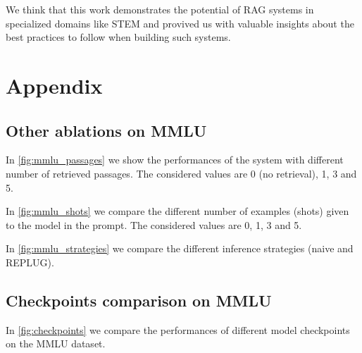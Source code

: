 \documentclass[11pt]{article}
\begin{document}
We think that this work demonstrates the potential of RAG systems in specialized 
domains like STEM and provived us with valuable insights about the best practices 
to follow when building such systems.

\newpage



\nocite{*}

\appendix

\section{Appendix}
\label{sec:appendix}

\subsection{Other ablations on MMLU}

In \ref{fig:mmlu_passages} we show the performances of the system with different 
number of retrieved passages. The considered values are 0 (no retrieval), 1, 3 and 5.

In \ref{fig:mmlu_shots} we compare the different number of examples (shots) given to
the model in the prompt. The considered values are 0, 1, 3 and 5.

In \ref{fig:mmlu_strategies} we compare the different inference strategies (naive and REPLUG).

\subsection{Checkpoints comparison on MMLU}

In \ref{fig:checkpoints} we compare the performances of different model checkpoints on the MMLU dataset.
\end{document}

